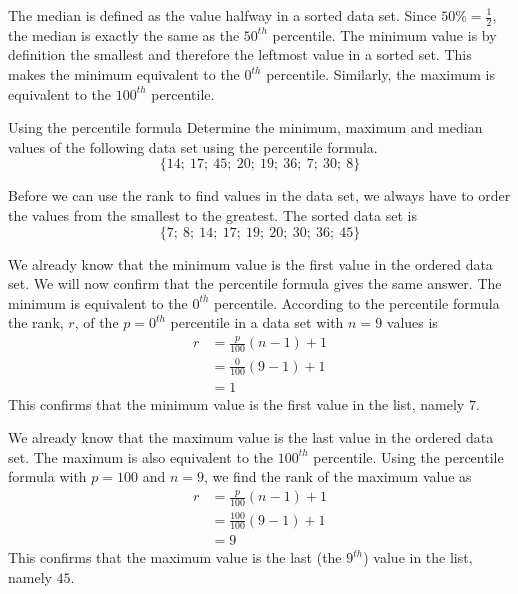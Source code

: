 The median is defined as the value halfway in a sorted data set. Since
$50\% = \frac{1}{2}$, the median is exactly the same as the $50^{th}$
percentile.  The minimum value is by definition the smallest and
therefore the leftmost value in a sorted set. This makes the minimum
equivalent to the $0^{th}$ percentile. Similarly, the maximum is
equivalent to the $100^{th}$ percentile.

\begin{wex}{Using the percentile formula}{
    Determine the minimum, maximum and median values of the following
    data set using the percentile formula.
    \begin{equation*}
      \{14;\ 17;\ 45;\ 20;\ 19;\ 36;\ 7;\ 30;\ 8\}
    \end{equation*}
}{

    Before we can use the rank to find values in the data set, we
    always have to order the values from the smallest to the
    greatest. The sorted data set is
    \begin{equation*}
      \{7;\ 8;\ 14;\ 17;\ 19;\ 20;\ 30;\ 36;\ 45\}
    \end{equation*}


    We already know that the minimum value is the first value in the
    ordered data set. We will now confirm that the percentile formula
    gives the same answer. The minimum is equivalent to the $0^{th}$
    percentile. According to the percentile formula the rank, $r$, of the
    $p = 0^{th}$ percentile in a data set with $n=9$ values is
    \begin{align*}
      r &= \frac{p}{100}\left(n-1\right)+1 \\
        &= \frac{0}{100}\left(9-1\right)+1 \\
        &= 1
    \end{align*}
    This confirms that the minimum value is the first value in the
    list, namely $7$.


    We already know that the maximum value is the last value in the
    ordered data set. The maximum is also equivalent to the $100^{th}$
    percentile. Using the percentile formula with $p=100$ and $n=9$,
    we find the rank of the maximum value as
    \begin{align*}
      r &= \frac{p}{100}\left(n-1\right)+1 \\
        &= \frac{100}{100}\left(9-1\right)+1 \\
        &= 9
    \end{align*}
    This confirms that the maximum value is the last (the $9^{th}$) value
    in the list, namely $45$.

}
\end{wex}

